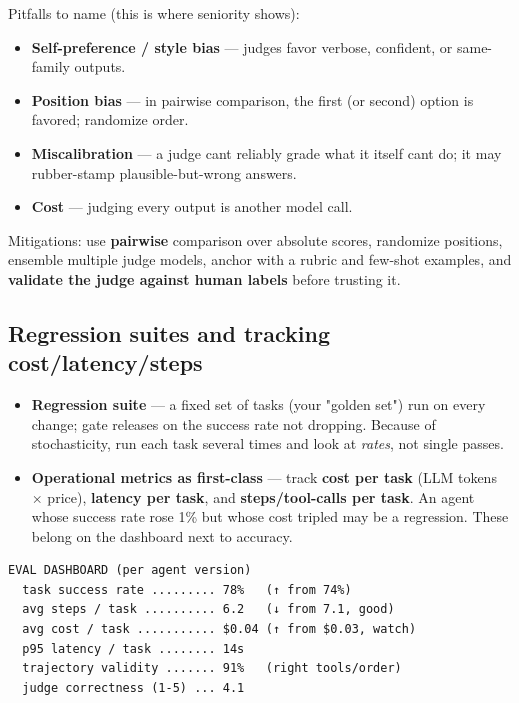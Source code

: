 \documentclass[11pt]{article}
\providecommand{\tightlist}{\setlength{\itemsep}{1pt}\setlength{\parskip}{0pt}}
\begin{document}
Pitfalls to name (this is where seniority shows):

\begin{itemize}
\tightlist
\item
  \textbf{Self-preference / style bias} --- judges favor verbose, confident, or same-family outputs.
\item
  \textbf{Position bias} --- in pairwise comparison, the first (or second) option is favored; randomize order.
\item
  \textbf{Miscalibration} --- a judge can\textquotesingle t reliably grade what it itself can\textquotesingle t do; it may rubber-stamp plausible-but-wrong answers.
\item
  \textbf{Cost} --- judging every output is another model call.
\end{itemize}

Mitigations: use \textbf{pairwise} comparison over absolute scores, randomize positions, ensemble multiple judge models, anchor with a rubric and few-shot examples, and \textbf{validate the judge against human labels} before trusting it.

\subsection{Regression suites and tracking cost/latency/steps}\label{regression-suites-and-tracking-costlatencysteps}

\begin{itemize}
\tightlist
\item
  \textbf{Regression suite} --- a fixed set of tasks (your "golden set") run on every change; gate releases on the success rate not dropping. Because of stochasticity, run each task several times and look at \emph{rates}, not single passes.
\item
  \textbf{Operational metrics as first-class} --- track \textbf{cost per task} (LLM tokens \(\times\) price), \textbf{latency per task}, and \textbf{steps/tool-calls per task}. An agent whose success rate rose 1\% but whose cost tripled may be a regression. These belong on the dashboard next to accuracy.
\end{itemize}

\setcodelang{}

\begin{verbatim}
EVAL DASHBOARD (per agent version)
  task success rate ......... 78%   (↑ from 74%)
  avg steps / task .......... 6.2   (↓ from 7.1, good)
  avg cost / task ........... $0.04 (↑ from $0.03, watch)
  p95 latency / task ........ 14s
  trajectory validity ....... 91%   (right tools/order)
  judge correctness (1-5) ... 4.1
\end{verbatim}
\end{document}
